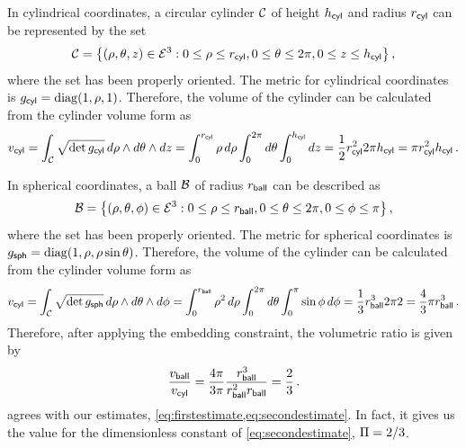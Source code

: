In cylindrical coordinates, a circular cylinder $\mathcal{C}$ of height $h_{\text{\textsf{cyl}}}$ and radius $r_{\text{\textsf{cyl}}}$ can be represented by the set
%
\begin{equation*}
  \region C = \desset{\tuple{\cxpos,\cypos,\czpos}\in\nespace 3}
                     {0\leq\cxpos\leq\rcyl,
                      0\leq\cypos\leq 2\pi,
                      0\leq\czpos\leq\hcyl
                     }\,,
\end{equation*}
%
where the set has been properly oriented.
%
The metric for cylindrical coordinates is $\metric\sbtxt{cyl} = \diag\vat{1,\cxpos,1}$. Therefore, the volume of the cylinder can be calculated from the cylinder volume form as
%
\begin{equation*}
  v_{\text{\textsf{cyl}}} = \int_{\mathcal{C}}\sqrt{\det g_{\text{\textsf{cyl}}}}\,d\rho\wedge d\theta\wedge dz
        = \int_{0}^{r_{\text{\textsf{cyl}}}}\rho\,d\rho \int_{0}^{2\pi}d\theta \int_{0}^{h_{\text{\textsf{cyl}}}}dz 
        = \dfrac 12 r_{\text{\textsf{cyl}}}^2 2\pi h_{\text{\textsf{cyl}}}
        = \pi r_{\text{\textsf{cyl}}}^2h_{\text{\textsf{cyl}}}\,.
\end{equation*}

In spherical coordinates, a ball $\mathcal{B}$ of radius $r_{\text{\textsf{ball}}}$ can be described as
%
\begin{equation*}
  \region B = \desset{\tuple{\sxpos,\sypos,\szpos}\in\nespace 3}
                     {0\leq\sxpos\leq\rball,
                      0\leq\sypos\leq 2\pi,
                      0\leq\szpos\leq \pi
                     }\,,
\end{equation*}
%
where the set has been properly oriented.
%
The metric for spherical coordinates is $\metric\sbtxt{sph} = \diag\vat{1,\sxpos,\sxpos\sin\sypos}$. Therefore, the volume of the cylinder can be calculated from the cylinder volume form as
%
\begin{equation*}
  v_{\text{\textsf{cyl}}} = \int_{\mathcal{C}}\sqrt{\det g_{\text{\textsf{sph}}}}\,d\rho\wedge d\theta\wedge d\phi
        = \int_{0}^{r_{\text{\textsf{ball}}}}\rho^2\,d\rho \int_{0}^{2\pi} d\theta \int_{0}^{\pi}\sin\phi\,d\phi 
        = \dfrac 13r_{\text{\textsf{ball}}}^3 2\pi 2
        = \dfrac 43\pi r_{\text{\textsf{ball}}}^3\,.
\end{equation*}
%
Therefore, after applying the embedding constraint, the volumetric ratio is given by
%
\begin{equation}\label{eq:volsbydifferentialgeometry}
  \dfrac{v_{\text{\textsf{ball}}}}{v_{\text{\textsf{cyl}}}} = \dfrac{4\pi}{3\pi}\dfrac{r_{\text{\textsf{ball}}}^3}{r_{\text{\textsf{ball}}}^2r_{\text{\textsf{ball}}}}
                        = \dfrac 23\,.
\end{equation}
%
  agrees with our estimates, \cref{eq:firstestimate,eq:secondestimate}. In fact, it gives us the value for the dimensionless constant of \cref{eq:secondestimate}, $\Pi = 2/3$. 

